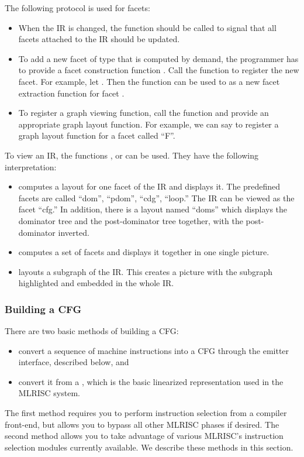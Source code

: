 The following protocol is used for facets:
\begin{itemize}
\item When the IR is changed, 
the function  should be called to 
signal that all facets attached to the IR should be updated.
\item To add a new facet of type  that is computed by demand,
the programmer has to provide a facet construction 
function .  Call the function 
to register the new facet.  For example, let . 
Then the function  can be used to as a new facet extraction
function for facet .
\item To register a graph viewing function, call
the function  and provide an appropriate 
graph layout function.  For example, we can say
 to register a graph layout function
for a facet called ``F''.
\end{itemize}

To view an IR, the functions ,  or
 can be used.  They have the following interpretation:
\begin{itemize}
\item {} computes a layout for one facet of the IR and displays
it.  The predefined facets are called
``dom'', ``pdom'', ``cdg'', ``loop.''  The IR can be
viewed as the facet ``cfg.'' In addition, there is a layout
named ``doms'' which displays the dominator tree and the post-dominator
tree together, with the post-dominator inverted.
\item {} computes a set of facets and displays it together
in one single picture.
\item {} layouts a subgraph of the IR.
This creates a picture with the subgraph highlighted and embedded
in the whole IR.
\end{itemize}

\subsubsection{Building a CFG}

There are two basic methods of building a CFG:
\begin{itemize}
\item convert a sequence of machine instructions
into a CFG through the emitter interface, described below, and 
\item convert it from a , which is
the basic linearized representation used in the MLRISC system.
\end{itemize}
The first method requires you to perform instruction selection
from a compiler front-end, but allows you to bypass all other
MLRISC phases if desired.  The second method allows you
to take advantage of various MLRISC's instruction selection modules
currently available.  We describe these methods in this section.

